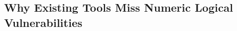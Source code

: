 \documentclass[10pt, conference]{IEEEtran}
\begin{document}
\subsection{Why Existing Tools Miss Numeric Logical Vulnerabilities}

\end{document}
